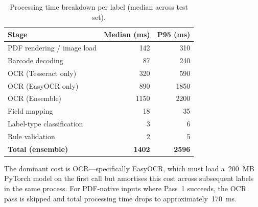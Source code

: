 \begin{table}[h]
\centering
\caption{Processing time breakdown per label (median across test set).}
\label{tab:timing}
\begin{tabular}{lrr}
\toprule
\textbf{Stage} & \textbf{Median (ms)} & \textbf{P95 (ms)} \\
\midrule
PDF rendering / image load   & 142 & 310 \\
Barcode decoding              & 87  & 240 \\
OCR (Tesseract only)          & 320 & 590 \\
OCR (EasyOCR only)            & 890 & 1850 \\
OCR (Ensemble)                & 1150 & 2200 \\
Field mapping                 & 18  & 35 \\
Label-type classification     & 3   & 6 \\
Rule validation               & 2   & 5 \\
\midrule
\textbf{Total (ensemble)}     & \textbf{1402} & \textbf{2596} \\
\bottomrule
\end{tabular}
\end{table}

The dominant cost is OCR—specifically EasyOCR, which must load a~200~MB PyTorch model
on the first call but amortises this cost across subsequent labels in the same process.
For PDF-native inputs where Pass~1 succeeds, the OCR pass is skipped and total processing
time drops to approximately~170~ms.
